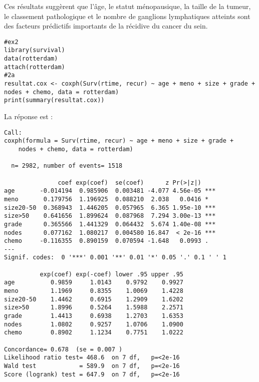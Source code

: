 \documentclass[../main.tex]{subfiles}
\begin{document}
\begin{CJK*}{UTF8}{gbsn}
Ces résultats suggèrent que l'âge, 
le statut ménopausique, la taille de la tumeur, 
le classement pathologique et le nombre de ganglions lymphatiques atteints 
sont des facteurs prédictifs importants de la récidive du cancer du sein.

\begin{lstlisting}
#ex2
library(survival)
data(rotterdam)
attach(rotterdam)
#2a
resultat.cox <- coxph(Surv(rtime, recur) ~ age + meno + size + grade + nodes + chemo, data = rotterdam)
print(summary(resultat.cox))
\end{lstlisting}

La réponse est :

\begin{lstlisting}
Call:
coxph(formula = Surv(rtime, recur) ~ age + meno + size + grade + 
    nodes + chemo, data = rotterdam)

  n= 2982, number of events= 1518 

               coef exp(coef)  se(coef)      z Pr(>|z|)    
age       -0.014194  0.985906  0.003481 -4.077 4.56e-05 ***
meno       0.179756  1.196925  0.088210  2.038   0.0416 *  
size20-50  0.368943  1.446205  0.057965  6.365 1.95e-10 ***
size>50    0.641656  1.899624  0.087968  7.294 3.00e-13 ***
grade      0.365566  1.441329  0.064432  5.674 1.40e-08 ***
nodes      0.077162  1.080217  0.004580 16.847  < 2e-16 ***
chemo     -0.116355  0.890159  0.070594 -1.648   0.0993 .  
---
Signif. codes:  0 '***' 0.001 '**' 0.01 '*' 0.05 '.' 0.1 ' ' 1

          exp(coef) exp(-coef) lower .95 upper .95
age          0.9859     1.0143    0.9792    0.9927
meno         1.1969     0.8355    1.0069    1.4228
size20-50    1.4462     0.6915    1.2909    1.6202
size>50      1.8996     0.5264    1.5988    2.2571
grade        1.4413     0.6938    1.2703    1.6353
nodes        1.0802     0.9257    1.0706    1.0900
chemo        0.8902     1.1234    0.7751    1.0222

Concordance= 0.678  (se = 0.007 )
Likelihood ratio test= 468.6  on 7 df,   p=<2e-16
Wald test            = 589.9  on 7 df,   p=<2e-16
Score (logrank) test = 647.9  on 7 df,   p=<2e-16
\end{lstlisting}
\end{CJK*}
\end{document}
